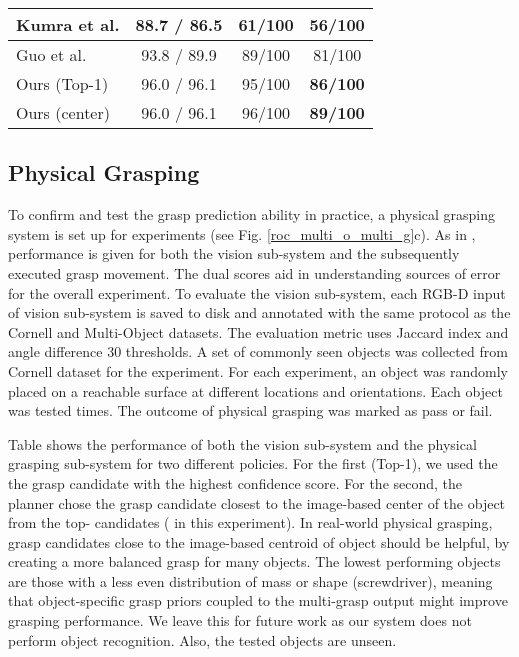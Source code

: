 \documentclass[letterpaper, 10 pt, journal, twoside]{IEEEtran}
\begin{document}
\begin {table}[t]
\begin{tabular}{ | l | c | c | c |}
    Kumra et al.	\cite{kumra2016robotic}       & 88.7   /  86.5   & 61/100   &  56/100  \\ \hline
    Guo et al. \cite{GuEtAl_ICRA2017}         & 93.8   /  89.9   & 89/100   & 81/100  \\ \hline \hline
    Ours (Top-1)                             &  96.0   /  96.1   &  95/100   &  \bf{86}/100  \\ \hline 
    Ours (center)                 &  96.0   /  96.1  &  96/100   &  \bf{89}/100  \\ 

    \hline
  \end{tabular}
\vspace*{-1ex}
\end {table}


\subsection{Physical Grasping}
To confirm and test the grasp prediction ability in practice, a physical
grasping system is set up for experiments (see Fig. \ref{roc_multi_o_multi_g}c). 
As in \cite{watson2017real}, performance is given for both the vision
sub-system and the subsequently executed grasp movement.   The dual
scores aid in understanding sources of error for the overall experiment.
To evaluate the vision sub-system, each RGB-D input of vision sub-system
is saved to disk and annotated with the same protocol as the Cornell and
Multi-Object datasets.  The evaluation metric uses Jaccard index
 and angle difference 30 thresholds. 
A set of  commonly seen objects was collected from Cornell dataset for the experiment.
For each experiment, an object was randomly placed on a reachable
surface at different locations and orientations. Each object was tested
 times.  The outcome of physical grasping was marked as pass or fail.

Table  shows the performance of both the vision sub-system and
the physical grasping sub-system for two different policies.  For the
first (Top-1), we used the the grasp candidate with the highest
confidence score. For the second, the planner chose the grasp candidate
closest to the image-based center of the object from the top- candidates
( in this experiment). 
In real-world physical grasping, grasp candidates close to the image-based
centroid of object should be helpful, by creating a more balanced grasp for
many objects.
The lowest performing objects
are those with a less even distribution of mass or shape (screwdriver), 
meaning that object-specific grasp priors coupled to the multi-grasp
output might improve grasping performance.  We leave this for future
work as our system does not perform object recognition. Also, the tested
objects are unseen.
\end{document}
